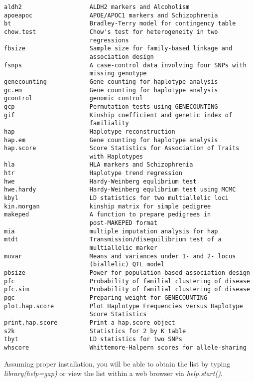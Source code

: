 \documentclass[10pt,a4paper]{article}
\begin{document}
\begin{verbatim}
aldh2                   ALDH2 markers and Alcoholism
apoeapoc                APOE/APOC1 markers and Schizophrenia
bt                      Bradley-Terry model for contingency table
chow.test               Chow's test for heterogeneity in two
                        regressions
fbsize                  Sample size for family-based linkage and
                        association design
fsnps                   A case-control data involving four SNPs with
                        missing genotype
genecounting            Gene counting for haplotype analysis
gc.em                   Gene counting for haplotype analysis
gcontrol                genomic control
gcp                     Permutation tests using GENECOUNTING
gif                     Kinship coefficient and genetic index of
                        familiality
hap                     Haplotype reconstruction
hap.em                  Gene counting for haplotype analysis
hap.score               Score Statistics for Association of Traits
                        with Haplotypes
hla                     HLA markers and Schizophrenia
htr                     Haplotype trend regression
hwe                     Hardy-Weinberg equlibrium test
hwe.hardy               Hardy-Weinberg equlibrium test using MCMC
kbyl                    LD statistics for two multiallelic loci
kin.morgan              kinship matrix for simple pedigree
makeped                 A function to prepare pedigrees in
                        post-MAKEPED format
mia                     multiple imputation analysis for hap
mtdt                    Transmission/disequilibrium test of a
                        multiallelic marker
muvar                   Means and variances under 1- and 2- locus
                        (biallelic) QTL model
pbsize                  Power for population-based association design
pfc                     Probability of familial clustering of disease
pfc.sim                 Probability of familial clustering of disease
pgc                     Preparing weight for GENECOUNTING
plot.hap.score          Plot Haplotype Frequencies versus Haplotype
                        Score Statistics
print.hap.score         Print a hap.score object
s2k                     Statistics for 2 by K table
tbyt                    LD statistics for two SNPs
whscore                 Whittemore-Halpern scores for allele-sharing
\end{verbatim}

Assuming proper installation, you will be able to obtain the list by typing
\textit{library(help=gap)} or view the list within a web browser via 
\textit{help.start()}.\\
\end{document}
